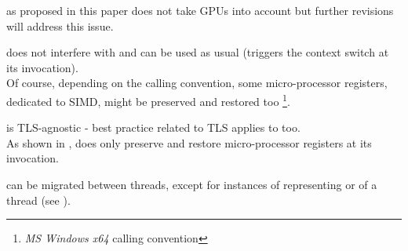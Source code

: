 

\cc as proposed in this paper does not take GPUs into account but further revisions
will address this issue.



does not interfere with \cc and can be used as usual (\cc triggers the context
switch at its invocation).\\
Of course, depending on the calling convention, some micro-processor registers,
dedicated to SIMD, might be preserved and restored too
\footnote{\emph{MS Windows x64} calling convention}.



\cc is TLS-agnostic - best practice related to TLS applies to \cc too.\\
As shown in , \cc does only  preserve and restore
micro-processor registers at its invocation.



\cont can be migrated between threads, except for instances of
\cont representing \main or \entryfn of a thread (see ).
